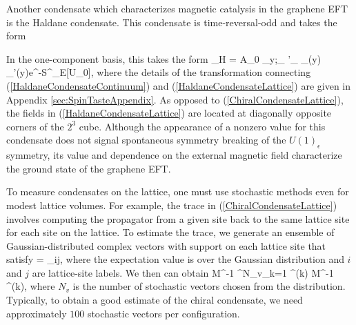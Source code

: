 \documentclass[aps,prd,twocolumn,showpacs,superscriptaddress,groupedaddress]{revtex4}  %
\begin{document}
Another condensate which characterizes magnetic catalysis in the graphene EFT is the Haldane condensate. This condensate is time-reversal-odd and takes the form
\begin{widetext}[
\beq
\label{HaldaneCondensateContinuum}
\Delta_H \equiv \vev{\Bpsi \left( \tilde{\gamma}_{4,5} \otimes \bm 1 \right) \Psi}  = \frac{1}{V} \frac{1}{Z} \int \mathcal{D}A_0  \int d^3x \Bpsi(x) \left( \tilde{\gamma}_{4,5} \otimes \bm 1 \right) \Psi(x)  e^{-S^{\text{eff}}_E[A_0]}.
\eeq
]\end{widetext}
In the one-component basis, this takes the form
\beq
\label{HaldaneCondensateLattice}
\Delta_H =   \int {}A_0 \sum_{y;\eta_{\mu} \neq \eta'_{\mu}} \chib_{\eta}(y) \chi_{\eta'}(y)e^{-S^{}_E[U_0]},
\eeq
where the details of the transformation connecting (\ref{HaldaneCondensateContinuum}) and (\ref{HaldaneCondensateLattice}) are given in Appendix \ref{sec:SpinTasteAppendix}.
As opposed to (\ref{ChiralCondensateLattice}), the fields in (\ref{HaldaneCondensateLattice}) are located at diagonally opposite corners of the $2^3$ cube.
Although the appearance of a nonzero value for this condensate does not signal spontaneous symmetry breaking of the $U(1)_{\epsilon}$ symmetry, its value and dependence on the external magnetic field characterize the ground state of the graphene EFT.

To measure condensates on the lattice, one must use stochastic methods even for modest lattice volumes. For example, the trace in (\ref{ChiralCondensateLattice}) involves computing the propagator from a given site back to the same lattice site for each site on the lattice. To estimate the trace, we generate an ensemble of Gaussian-distributed complex vectors with support on each lattice site that satisfy
\beq
\label{StochasticOrthogonality}
 = \delta_{ij},
\eeq
where the expectation value is over the Gaussian distribution and $i$ and $j$ are lattice-site labels. We then can obtain
\beq
\tr M^{-1} \approx {} \sum^{N_v}_{k=1} \Phi^{(k) \dagger} M^{-1} \Phi^{(k)},
\eeq
where $N_v$ is the number of stochastic vectors chosen from the distribution. Typically, to obtain a good estimate of the chiral condensate, we need approximately $100$ stochastic vectors per configuration. 
\end{document}
